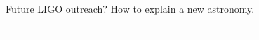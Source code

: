         Future LIGO outreach? How to explain a new astronomy.


        --------------------------------------





